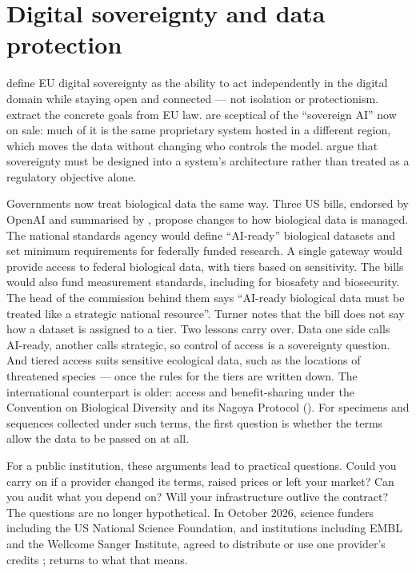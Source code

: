 \section{Digital sovereignty and data protection}

\textcite{jrc2025opensovereignty} define EU digital sovereignty as the ability to
act independently in the digital domain while staying open and connected ---
not isolation or protectionism. \textcite{anand2026digitalsovereignty} extract the
concrete goals from EU law. \textcite{hai2026sovereignty} are sceptical of the
``sovereign AI'' now on sale: much of it is the same proprietary system hosted in
a different region, which moves the data without changing who controls the
model. \textcite{esposito2026sovereign} argue that sovereignty must be designed
into a system's architecture rather than treated as a regulatory objective
alone.

Governments now treat biological data the same way. Three US bills, endorsed by
OpenAI and summarised by \textcite{turner2026databills}, propose changes to how
biological data is managed. The national standards agency would define
``AI-ready'' biological datasets and set minimum requirements for federally
funded research. A single gateway would provide access to federal biological
data, with tiers based on sensitivity. The bills would also fund measurement
standards, including for biosafety and biosecurity. The head of
the commission behind them says ``AI-ready biological data must be treated like a
strategic national resource''. Turner notes that the bill does not say how a
dataset is assigned to a tier. Two lessons carry over. Data one side calls
AI-ready, another calls strategic, so control of access is a sovereignty
question. And tiered access suits sensitive ecological data, such as the
locations of threatened species --- once the rules for the tiers are written
down. The international counterpart is older: access and benefit-sharing
under the Convention on Biological Diversity and its Nagoya Protocol
(). For specimens and sequences collected under such terms, the
first question is whether the terms allow the data to be passed on at all.

For a public institution, these arguments lead to practical questions. Could you carry on
if a provider changed its terms, raised prices or left your market? Can you
audit what you depend on? Will your infrastructure outlive the contract?
The questions are no longer hypothetical. In October 2026, science funders
including the US National Science Foundation, and institutions including
EMBL and the Wellcome Sanger Institute, agreed to distribute or use one
provider's credits \parencite{anthropic2026aiforscience};
 returns to what that means.

